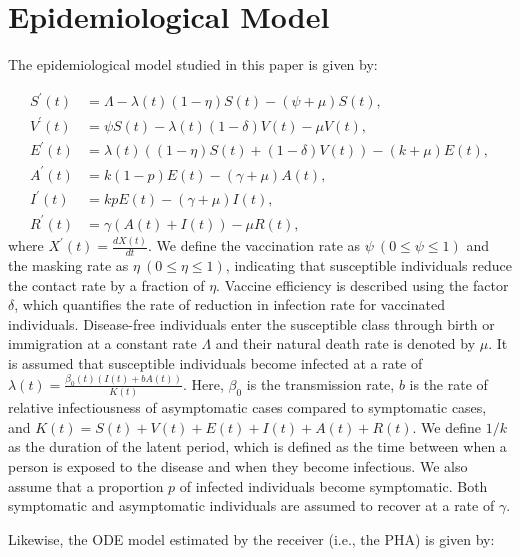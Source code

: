 \documentclass[sigconf,review]{acmart}
\begin{document}
\newpage
\appendix
\setcounter{table}{0}
\renewcommand{\thetable}{A\arabic{table}}

\setcounter{figure}{0}
\renewcommand{\thefigure}{A\arabic{figure}}

\section{Epidemiological Model}
\label{supp:epi_model}
The epidemiological model studied in this paper is given by:

\begin{align}
S^{\prime}(t) &= \Lambda - \lambda(t)(1-\eta)S(t) - (\psi + \mu)S(t), \nonumber \\
V^{\prime}(t) &= \psi S(t) - \lambda(t)(1-\delta)V(t) - \mu V(t), \nonumber \\
E^{\prime}(t) &= \lambda(t)\left((1-\eta)S(t) + (1-\delta)V(t)\right)- (k+\mu)E(t), \nonumber \\
A^{\prime}(t) &= k(1-p)E(t) - (\gamma+\mu)A(t), \nonumber \\
I^{\prime}(t) &= kpE(t) - (\gamma+\mu)I(t), \nonumber \\
R^{\prime}(t) &= \gamma (A(t) + I(t)) - \mu R(t), \label{eq_ODE}
\end{align}
where $X^{\prime}(t) = \frac{d X(t)}{d t}$. We define the vaccination rate as $\psi\ (0\leq \psi \leq 1)$ and the masking rate as $\eta\ (0\leq \eta \leq 1)$, indicating that susceptible individuals reduce the contact rate by a fraction of $\eta$. 
Vaccine efficiency is described using the factor $\delta$, which quantifies the rate of reduction in infection rate for vaccinated individuals. 
Disease-free individuals enter the susceptible class through birth or immigration at a constant rate $\Lambda$ and their natural death rate is denoted by $\mu$. It is assumed that susceptible individuals become infected at a rate of $\lambda(t) = \frac{\beta_0(t)(I(t)+bA(t))}{K(t)}$. Here, $\beta_0$ is the transmission rate, $b$ is the rate of relative infectiousness of asymptomatic cases compared to symptomatic cases, and $K(t) = S(t) + V(t) + E(t) + I(t) + A(t)+R(t)$. We define $1/k$ as the duration of the latent period, which is defined as the time between when a person is exposed to the disease and when they become infectious. We also assume that a proportion $p$ of infected individuals become symptomatic.  Both symptomatic and asymptomatic individuals are assumed to recover at a rate of $\gamma$. 

Likewise, the ODE model estimated by the receiver (i.e., the PHA) is given by:
\end{document}
